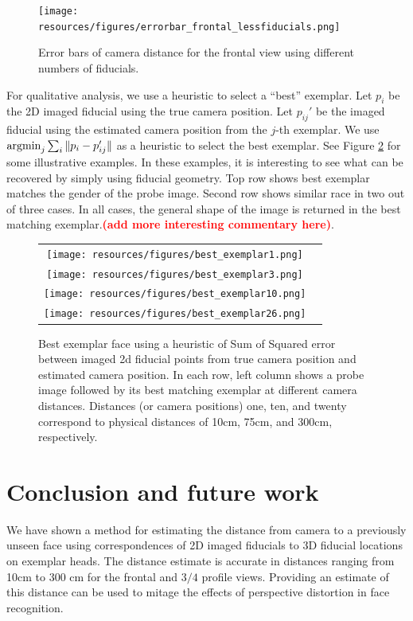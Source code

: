 \documentclass[runningheads]{llncs}
\newcommand{\argmin}{\operatornamewithlimits{argmin}}
\newcommand {\afbnote} [1] {{\bf \textcolor{red}{(#1)}}}
\begin{document}
\begin{figure}[h]
\centering
\texttt{[image: resources/figures/errorbar\_frontal\_lessfiducials.png]}
\caption{Error bars of camera distance for the frontal view using different numbers of fiducials.}
\label{fig:error_bar_frontal_lessfiducials}
\end{figure}

For qualitative analysis, we use a heuristic to select a ``best'' exemplar.  Let $p_i$ be the 2D imaged fiducial using the true camera position.  
Let $p_{ij}'$ be the imaged fiducial using the estimated camera position from the $j$-th exemplar.
We use $\argmin_j \sum_i \|p_i - p_{ij}'\|$ as a heuristic to select the best exemplar. 
See Figure \ref{fig:bestexemplar} for some illustrative examples.  
In these examples, it is interesting to see what can be recovered by simply using fiducial geometry.  
Top row shows best exemplar matches the gender of the probe image.  
Second row shows similar race in two out of three cases.  
In all cases, the general shape of the image is returned in the best matching exemplar.\afbnote{add more interesting commentary here}.

\begin{figure}[h]
\centering
\begin{tabular}{cc}
\texttt{[image: resources/figures/best\_exemplar1.png]} \\
\texttt{[image: resources/figures/best\_exemplar3.png]} \\
\texttt{[image: resources/figures/best\_exemplar10.png]} \\
\texttt{[image: resources/figures/best\_exemplar26.png]}
\end{tabular}
\caption{Best exemplar face using a heuristic of Sum of Squared error between imaged 2d fiducial points from true camera position and estimated camera position.  In each row, left column shows a probe image followed by its best matching exemplar at different camera distances. Distances (or camera positions) one, ten, and twenty correspond to physical distances of 10cm, 75cm, and 300cm, respectively. }
\label{fig:bestexemplar}
\end{figure}

\section{Conclusion and future work} \label{sec:discussion}
We have shown a method for estimating the distance from camera to a previously unseen face using correspondences of 2D imaged fiducials to 3D fiducial locations on exemplar heads.  
The distance estimate is accurate in distances ranging from 10cm to 300 cm for the frontal and $3/4$ profile views.  
Providing an estimate of this distance can be used to mitage the effects of perspective distortion in face recognition.  
\end{document}
